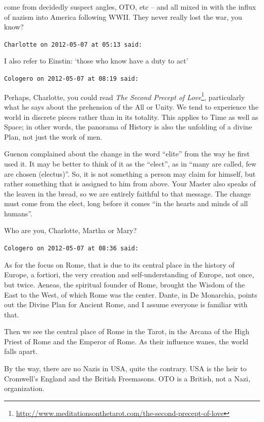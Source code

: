 \begin{footnotesize}
\begin{sffamily}
come from decidedly suspect angles, OTO, etc -- and all mixed in with the influx of nazism into America following WWII. They never really lost the war, you know?

\hfill

\texttt{Charlotte on 2012-05-07 at 05:13 said:}

I also refer to Einstin: `those who know have a duty to act'

\hfill

\texttt{Cologero on 2012-05-07 at 08:19 said:}

Perhaps, Charlotte, you could read \textit{The Second Precept of Love}\footnote{\url{http://www.meditationsonthetarot.com/the-second-precept-of-love}}, particularly what he says about the prehension of the All or Unity. We tend to experience the world in discrete pieces rather than in its totality. This applies to Time as well as Space; in other words, the panorama of History is also the unfolding of a divine Plan, not just the work of men.

Guenon complained about the change in the word ``elite'' from the way he first used it. It may be better to think of it as the ``elect'', as in ``many are called, few are chosen (electus)''. So, it is not something a person may claim for himself, but rather something that is assigned to him from above. Your Master also speaks of the leaven in the bread, so we are entirely faithful to that message. The change must come from the elect, long before it comes ``in the hearts and minds of all humans''.

Who are you, Charlotte, Martha or Mary?

\hfill

\texttt{Cologero on 2012-05-07 at 08:36 said:}

As for the focus on Rome, that is due to its central place in the history of Europe, a fortiori, the very creation and self-understanding of Europe, not once, but twice. Aeneas, the spiritual founder of Rome, brought the Wisdom of the East to the West, of which Rome was the center. Dante, in De Monarchia, points out the Divine Plan for Ancient Rome, and I assume everyone is familiar with that.

Then we see the central place of Rome in the Tarot, in the Arcana of the High Priest of Rome and the Emperor of Rome. As their influence wanes, the world falls apart.

By the way, there are no Nazis in USA, quite the contrary. USA is the heir to Cromwell's England and the British Freemasons. OTO is a British, not a Nazi, organization.


\end{sffamily}
\end{footnotesize}
